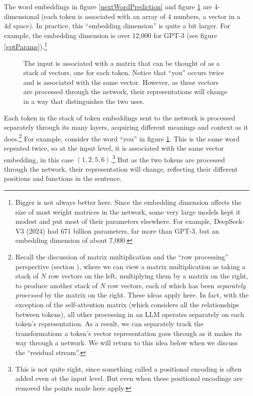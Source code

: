 The word embeddings in figure \ref{nextWordPrediction} and figure
\ref{sequenceDim} are 4-dimensional (each token is associated with an array of
4 numbers, a vector in a 4d space). In practice, this ``embedding dimension''
is quite a bit larger. For example, the embedding dimension is over 12,000 for GPT-3 (see figure \ref{gptParams}).\footnote{Bigger is not always better here. Since the embedding dimension affects the size of most weight matrices in the network, some very large models kept it modest and put most of their parameters elsewhere. For example, DeepSeek-V3 (2024) had 671 billion parameters, far more than GPT-3, but an embedding dimension of about 7,000.}

\begin{figure}[ht]
\centering
{}
\caption[Jeff Yoshimi.]{The input is associated with a matrix that can
be thought of as a stack of vectors, one for each token. Notice that ``you''
occurs twice and is associated with the same vector. However, as these vectors
are processed through the network, their representations will change in a way
that distinguishes the two uses.
}
\label{sequenceDim}
\end{figure}

Each token in the stack of token embeddings sent to the network is processed separately through its many layers, acquiring different meanings and context as it does.\footnote{Recall the discussion of matrix multiplication and the ``row processing'' perspective (section ), where we can view a matrix multiplication as taking a stack of $N$ row vectors on the left, multiplying them by a matrix on the right, to produce another stack of $N$ row vectors, each of which has been \emph{separately processed} by the matrix on the right.  These ideas apply here.  In fact, with the exception of the self-attention matrix (which considers all the relationships between tokens), all other processing in an LLM operates separately on each token's representation. As a result, we can separately track the transformations a token's vector representation goes through as it makes its way through a network.  We will return to this idea below when we discuss the ``residual stream''.} For example, consider the word ``you'' in figure \ref{sequenceDim}. This is the same word repeated twice, so at the input level, it is associated with the same vector embedding, in this case $(1,2,5,6)$.\footnote{This is not quite right, since something called a positional encoding is often added even at the input level. But even when these positional encodings are removed the points made here apply.} But as the two tokens are processed through the network, their representation will change, reflecting their different positions and functions in the sentence.

